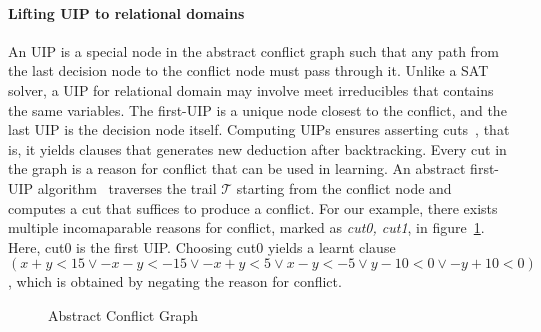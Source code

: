 \paragraph {\textbf{Lifting UIP to relational domains}}
An UIP is a special node in the abstract conflict graph such that 
any path from the last decision node to the conflict node must pass 
through it.  Unlike a SAT solver, a UIP for relational domain may 
involve meet irreducibles that contains the same variables.  The 
first-UIP is a unique node closest to the conflict, and the last UIP 
is the decision node itself.  Computing UIPs ensures asserting
cuts~\cite{cdcl,DBLP:journals/fmsd/BrainDGHK14}, that is, it 
yields clauses that generates new deduction after backtracking.  
Every cut in the graph is a reason for conflict that can be 
used in learning.  An abstract first-UIP algorithm~\cite{DBLP:journals/fmsd/BrainDGHK14} 
traverses the trail $\mathcal{T}$ starting from the conflict node and 
computes a cut that suffices to produce a conflict. 
For our example, there exists multiple incomaparable reasons for conflict,
marked as {\em cut0, cut1}, in figure~\ref{conflict}.  Here, cut0 is the first UIP.  
Choosing cut0 yields a learnt clause 
$(x+y<15 \vee -x-y<-15 \vee -x+y<5 \vee x-y<-5 \vee y-10<0 \vee -y+10<0)$, 
which is obtained by negating the reason for conflict.  
%
\begin{figure}[t]
\caption{\label{conflict} Abstract Conflict Graph}
\end{figure} 
%    
